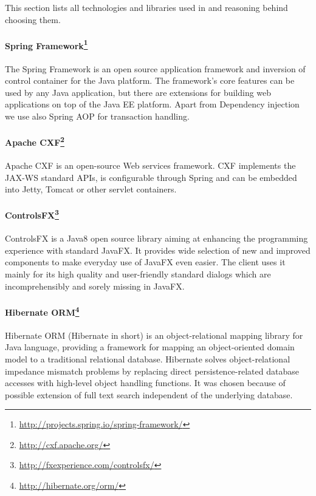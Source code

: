 
\label{sec:UsedTechnologies}

This section lists all technologies and libraries used in \textan{} and
reasoning behind choosing them.

\paragraph{Spring Framework\footnote{\url{http://projects.spring.io/spring-framework/}}}
The Spring Framework is an open source application framework and inversion
of control container for the Java platform. The framework's core features
can be used by any Java application, but there are extensions for building
web applications on top of the Java EE platform. Apart from Dependency injection
we use also Spring AOP for transaction handling.

\paragraph{Apache CXF\footnote{\url{http://cxf.apache.org/}}}
Apache CXF is an open-source Web services framework. CXF implements the JAX-WS
standard APIs, is configurable through Spring and can be embedded into Jetty,
Tomcat or other servlet containers.

\paragraph{ControlsFX\footnote{\url{http://fxexperience.com/controlsfx/}}}
ControlsFX is a Java8 open source library aiming at enhancing the programming
experience with standard JavaFX. It provides wide selection of new and improved
components to make everyday use of JavaFX even easier. The \textan{} client uses
it mainly for its high quality and user-friendly standard dialogs which are
incomprehensibly and sorely missing in JavaFX.

\paragraph{Hibernate ORM\footnote{\url{http://hibernate.org/orm/}}}
Hibernate ORM (Hibernate in short) is an object-relational mapping library for
Java language, providing a framework for mapping an object-oriented domain
model to a traditional relational database. Hibernate solves object-relational
im\-pedance mismatch problems by replacing direct persistence-related database
accesses with high-level object handling functions. It was chosen because of
possible extension of full text search independent of the underlying database.

